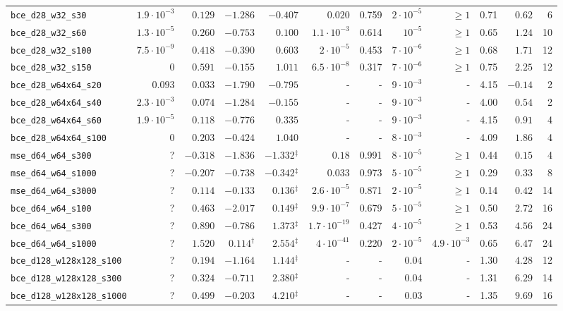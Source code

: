 \begin{tabular}{lrrrrrrrrrrr}
\midrule
\texttt{bce\_d28\_w32\_s30} & $1.9\cdot10^{-3}$ & $0.129$ & $-1.286$ & $-0.407$ & $0.020$ & 0.759 & $2\cdot10^{-5}$ & $\geq1$ & 0.71 & $0.62$ & 6\\
\texttt{bce\_d28\_w32\_s60} & $1.3\cdot10^{-5}$ & $0.260$ & $-0.753$ & $0.100$ & $1.1\cdot10^{-3}$ & 0.614 & $10^{-5}$ & $\geq1$ & 0.65 & $1.24$ & 10\\
\texttt{bce\_d28\_w32\_s100} & $7.5\cdot10^{-9}$ & $0.418$ & $-0.390$ & $0.603$ & $2\cdot10^{-5}$ & 0.453 & $7\cdot10^{-6}$ & $\geq1$ & 0.68 & $1.71$ & 12\\
\texttt{bce\_d28\_w32\_s150} & $0$ & $0.591$ & $-0.155$ & $1.011$ & $6.5\cdot10^{-8}$ & 0.317 & $7\cdot10^{-6}$ & $\geq1$ & 0.75 & $2.25$ & 12\\
\texttt{bce\_d28\_w64x64\_s20} & $0.093$ & $0.033$ & $-1.790$ & $-0.795$ & - & - & $9\cdot10^{-3}$ & - & 4.15 & $-0.14$ & 2\\
\texttt{bce\_d28\_w64x64\_s40} & $2.3\cdot10^{-3}$ & $0.074$ & $-1.284$ & $-0.155$ & - & - & $9\cdot10^{-3}$ & - & 4.00 & $0.54$ & 2\\
\texttt{bce\_d28\_w64x64\_s60} & $1.9\cdot10^{-5}$ & $0.118$ & $-0.776$ & $0.335$ & - & - & $9\cdot10^{-3}$ & - & 4.15 & $0.91$ & 4\\
\texttt{bce\_d28\_w64x64\_s100} & $0$ & $0.203$ & $-0.424$ & $1.040$ & - & - & $8\cdot10^{-3}$ & - & 4.09 & $1.86$ & 4\\
\midrule
\texttt{mse\_d64\_w64\_s300} & ? & $-0.318$ & $-1.836$ & $-1.332$$^\ddagger$ & $0.18$ & 0.991 & $8\cdot10^{-5}$ & $\geq1$ & 0.44 & $0.15$ & 4\\
\texttt{mse\_d64\_w64\_s1000} & ? & $-0.207$ & $-0.738$ & $-0.342$$^\ddagger$ & $0.033$ & 0.973 & $5\cdot10^{-5}$ & $\geq1$ & 0.29 & $0.33$ & 8\\
\texttt{mse\_d64\_w64\_s3000} & ? & $0.114$ & $-0.133$ & $0.136$$^\ddagger$ & $2.6\cdot10^{-5}$ & 0.871 & $2\cdot10^{-5}$ & $\geq1$ & 0.14 & $0.42$ & 14\\
\texttt{bce\_d64\_w64\_s100} & ? & $0.463$ & $-2.017$ & $0.149$$^\ddagger$ & $9.9\cdot10^{-7}$ & 0.679 & $5\cdot10^{-5}$ & $\geq1$ & 0.50 & $2.72$ & 16\\
\texttt{bce\_d64\_w64\_s300} & ? & $0.890$ & $-0.786$ & $1.373$$^\ddagger$ & $1.7\cdot10^{-19}$ & 0.427 & $4\cdot10^{-5}$ & $\geq1$ & 0.53 & $4.56$ & 24\\
\texttt{bce\_d64\_w64\_s1000} & ? & $1.520$ & $0.114$$^\dagger$ & $2.554$$^\ddagger$ & $4\cdot10^{-41}$ & 0.220 & $2\cdot10^{-5}$ & $4.9\cdot10^{-3}$ & 0.65 & $6.47$ & 24\\
\texttt{bce\_d128\_w128x128\_s100} & ? & $0.194$ & $-1.164$ & $1.144$$^\ddagger$ & - & - & $0.04$ & - & 1.30 & $4.28$ & 12\\
\texttt{bce\_d128\_w128x128\_s300} & ? & $0.324$ & $-0.711$ & $2.380$$^\ddagger$ & - & - & $0.04$ & - & 1.31 & $6.29$ & 14\\
\texttt{bce\_d128\_w128x128\_s1000} & ? & $0.499$ & $-0.203$ & $4.210$$^\ddagger$ & - & - & $0.03$ & - & 1.35 & $9.69$ & 16\\
\bottomrule
\end{tabular}

